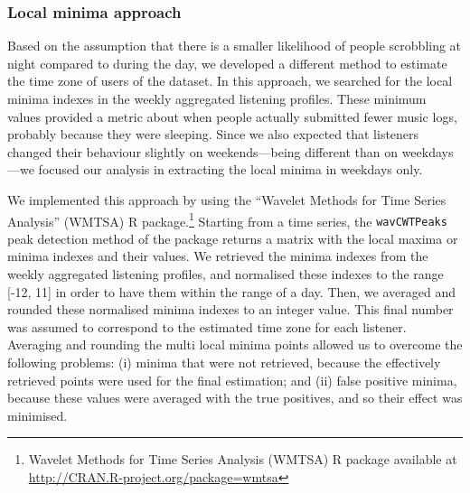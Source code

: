 





\subsubsection{Local minima approach}
Based on the assumption that there is a smaller likelihood of people scrobbling at night compared to during the day, we developed a different method to estimate the time zone of users of the dataset. 
In this approach, we searched for the local minima indexes in the weekly aggregated listening profiles.
These minimum values provided a metric about when people actually submitted fewer music logs, probably because they were sleeping. 
Since we also expected that listeners changed their behaviour slightly on weekends---being different than on weekdays---we focused our analysis in extracting the local minima in weekdays only.

We implemented this approach by using the ``Wavelet Methods for Time Series Analysis'' (WMTSA) R package.\footnote{Wavelet Methods for Time Series Analysis (WMTSA) R package available at \url{http://CRAN.R-project.org/package=wmtsa}} Starting from a time series, the {\tt wavCWTPeaks} peak detection method of the package returns a matrix with the local maxima or minima indexes and their values. We retrieved the minima indexes from the weekly aggregated listening profiles, and normalised these indexes to the range [-12, 11] in order to have them within the range of a day. 
Then, we averaged and rounded these normalised minima indexes to an integer value. This final number was assumed to correspond to the estimated time zone for each listener. 
Averaging and rounding the multi local minima points allowed us to overcome the following problems: (i) minima that were not retrieved, because the effectively retrieved points were used for the final estimation; and (ii) false positive minima, because these values were averaged with the true positives, and so their effect was minimised. 


